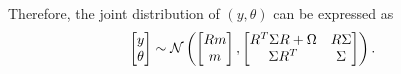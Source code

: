 \documentclass[letter, 10pt]{article}
\begin{document}
%
%
Therefore, the joint distribution of $(y, \theta)$ can be expressed as
%
%
\begin{align*}
  \begin{bmatrix}
    y \\ \theta
  \end{bmatrix}
  &\sim
    \mathcal{N} 
    \left(
    \begin{bmatrix}
      Rm \\ m
    \end{bmatrix} ,
  \begin{bmatrix}
      R^T \Sigma R + \Omega & R\Sigma \\
      \Sigma R^T & \Sigma
    \end{bmatrix}
    \right).
\end{align*}

\end{document}
